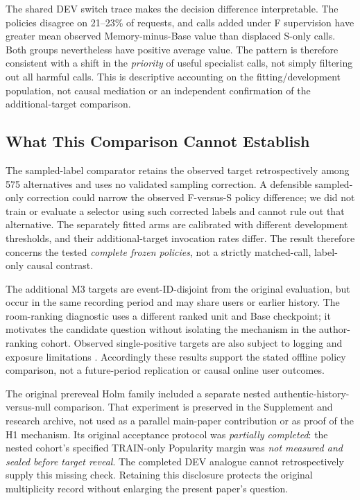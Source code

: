 \documentclass[preprint,12pt]{elsarticle}
\begin{document}
The shared DEV switch trace makes the decision difference interpretable. The policies disagree on 21--23\% of requests, and calls added under F supervision have greater mean observed Memory-minus-Base value than displaced S-only calls. Both groups nevertheless have positive average value. The pattern is therefore consistent with a shift in the \emph{priority} of useful specialist calls, not simply filtering out all harmful calls. This is descriptive accounting on the fitting/development population, not causal mediation or an independent confirmation of the additional-target comparison.

\subsection{What This Comparison Cannot Establish}
\label{sec:discussion-validity}

The sampled-label comparator retains the observed target retrospectively among 575 alternatives and uses no validated sampling correction. A defensible sampled-only correction could narrow the observed F-versus-S policy difference; we did not train or evaluate a selector using such corrected labels and cannot rule out that alternative. The separately fitted arms are calibrated with different development thresholds, and their additional-target invocation rates differ. The result therefore concerns the tested \emph{complete frozen policies}, not a strictly matched-call, label-only causal contrast.

The additional M3 targets are event-ID-disjoint from the original evaluation, but occur in the same recording period and may share users or earlier history. The room-ranking diagnostic uses a different ranked unit and Base checkpoint; it motivates the candidate question without isolating the mechanism in the author-ranking cohort. Observed single-positive targets are also subject to logging and exposure limitations \cite{pereira2025samplingreliability}. Accordingly these results support the stated offline policy comparison, not a future-period replication or causal online user outcomes.

The original prereveal Holm family included a separate nested authentic-history-versus-null comparison. That experiment is preserved in the Supplement and research archive, not used as a parallel main-paper contribution or as proof of the H1 mechanism. Its original acceptance protocol was \emph{partially completed}: the nested cohort's specified TRAIN-only Popularity margin was \emph{not measured and sealed before target reveal}. The completed DEV analogue cannot retrospectively supply this missing check. Retaining this disclosure protects the original multiplicity record without enlarging the present paper's question.
\end{document}
